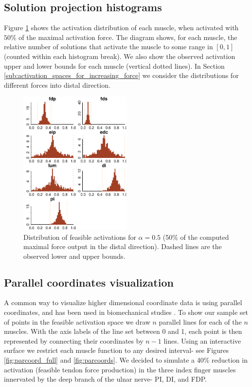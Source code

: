 \subsection{Solution projection histograms}
Figure \ref{fig:raw_histograms} shows the activation distribution of each muscle, when activated with $50\%$ of the maximal activation force. The diagram shows, for each muscle, the relative number of solutions that activate the muscle to some range in $[0,1]$ (counted within each histogram break).
We also show the observed activation upper and lower bounds for each muscle (vertical dotted lines).
In Section \ref{sub:activation_spaces_for_increasing_force} we consider the distributions for different forces into distal direction.
\begin{figure}[!htbp]
\centering
\includegraphics[width=0.5\textwidth]{figs/raw_histograms.pdf}
\caption{Distribution of feasible activations for $\alpha= 0.5$ (50\% of the computed maximal force output in the distal direction). Dashed lines are the observed lower and upper bounds.}
\label{fig:raw_histograms}
\end{figure}

\subsection{Parallel coordinates visualization}
A common way to visualize higher dimensional coordinate data is using parallel coordinates, and has been used in biomechanical studies \cite{bachynskyi2013biomechanical, krekel2010visual}.
To show our sample set of points in the feasible activation space we draw $n$ parallel lines for each of the $n$ muscles.
With the axis labels of the line set between 0 and 1, each point is then represented by connecting their coordinates by $n-1$ lines.
Using an interactive surface we restrict each muscle function to any desired interval- see Figures \ref{fig:parcoord_full} and \ref{fig:parcoords}.
We decided to simulate a 40\% reduction in activation (feasible tendon force production) in the three index finger muscles innervated by the deep branch of the ulnar nerve- PI, DI, and FDP. 

